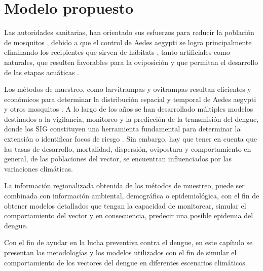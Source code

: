 \chapter{Modelo propuesto}

Las autoridades sanitarias, han orientado sus esfuerzos para reducir la población de mosquitos
\cite{planControlMspbs2014}, debido a que el control de Aedes aegypti se logra principalmente
eliminando los recipientes que sirven de hábitats \cite{world2009dengue}, tanto artificiales como
naturales, que resulten favorables para la oviposición y que permitan el desarrollo de las etapas
acuáticas \cite{world2009dengue, directricesDetvArg}.

Los métodos de muestreo, como larvitrampas y ovitrampas resultan eficientes y económicos para
determinar la distribución espacial y temporal de Aedes aegypti y otros mosquitos
\cite{dengueUruguayCap1, cenaprece2013}. A lo largo de los años se han desarrollado múltiples
modelos destinados a la vigilancia, monitoreo y la predicción de la transmisión del dengue, donde
los SIG constituyen una herramienta fundamental para determinar la extensión o identificar focos
de riesgo \citep{vgomesAegis2001, NINO2011}. Sin embargo, hay que tener en cuenta que las tasas de
desarrollo, mortalidad, dispersión, ovipostura y comportamiento en general, de las poblaciones del
vector, se encuentran influenciados por las variaciones climáticas.

La información regionalizada obtenida de los métodos de muestreo, puede ser combinada con
información ambiental, demográfica o epidemiológica, con el fin de obtener modelos detallados que
tengan la capacidad de monitorear, simular el comportamiento del vector y en consecuencia,
predecir una posible epidemia del dengue.

Con el fin de ayudar en la lucha preventiva contra el dengue, en este capítulo se presentan las
metodologías y los modelos utilizados con el fin de simular el comportamiento de los vectores del
dengue en diferentes escenarios climáticos.





